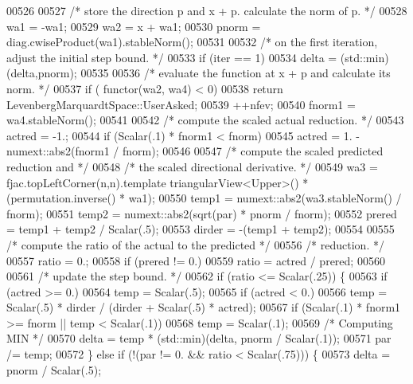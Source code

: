 \begin{DoxyCode}
00526 
00527         \textcolor{comment}{/* store the direction p and x + p. calculate the norm of p. */}
00528         wa1 = -wa1;
00529         wa2 = x + wa1;
00530         pnorm = diag.cwiseProduct(wa1).stableNorm();
00531 
00532         \textcolor{comment}{/* on the first iteration, adjust the initial step bound. */}
00533         \textcolor{keywordflow}{if} (iter == 1)
00534             delta = (std::min)(delta,pnorm);
00535 
00536         \textcolor{comment}{/* evaluate the function at x + p and calculate its norm. */}
00537         \textcolor{keywordflow}{if} ( functor(wa2, wa4) < 0)
00538             \textcolor{keywordflow}{return} LevenbergMarquardtSpace::UserAsked;
00539         ++nfev;
00540         fnorm1 = wa4.stableNorm();
00541 
00542         \textcolor{comment}{/* compute the scaled actual reduction. */}
00543         actred = -1.;
00544         \textcolor{keywordflow}{if} (Scalar(.1) * fnorm1 < fnorm)
00545             actred = 1. - numext::abs2(fnorm1 / fnorm);
00546 
00547         \textcolor{comment}{/* compute the scaled predicted reduction and */}
00548         \textcolor{comment}{/* the scaled directional derivative. */}
00549         wa3 = fjac.topLeftCorner(n,n).template triangularView<Upper>() * (permutation.inverse() * wa1);
00550         temp1 = numext::abs2(wa3.stableNorm() / fnorm);
00551         temp2 = numext::abs2(sqrt(par) * pnorm / fnorm);
00552         prered = temp1 + temp2 / Scalar(.5);
00553         dirder = -(temp1 + temp2);
00554 
00555         \textcolor{comment}{/* compute the ratio of the actual to the predicted */}
00556         \textcolor{comment}{/* reduction. */}
00557         ratio = 0.;
00558         \textcolor{keywordflow}{if} (prered != 0.)
00559             ratio = actred / prered;
00560 
00561         \textcolor{comment}{/* update the step bound. */}
00562         \textcolor{keywordflow}{if} (ratio <= Scalar(.25)) \{
00563             \textcolor{keywordflow}{if} (actred >= 0.)
00564                 temp = Scalar(.5);
00565             \textcolor{keywordflow}{if} (actred < 0.)
00566                 temp = Scalar(.5) * dirder / (dirder + Scalar(.5) * actred);
00567             \textcolor{keywordflow}{if} (Scalar(.1) * fnorm1 >= fnorm || temp < Scalar(.1))
00568                 temp = Scalar(.1);
00569             \textcolor{comment}{/* Computing MIN */}
00570             delta = temp * (std::min)(delta, pnorm / Scalar(.1));
00571             par /= temp;
00572         \} \textcolor{keywordflow}{else} \textcolor{keywordflow}{if} (!(par != 0. && ratio < Scalar(.75))) \{
00573             delta = pnorm / Scalar(.5);

\end{DoxyCode}
